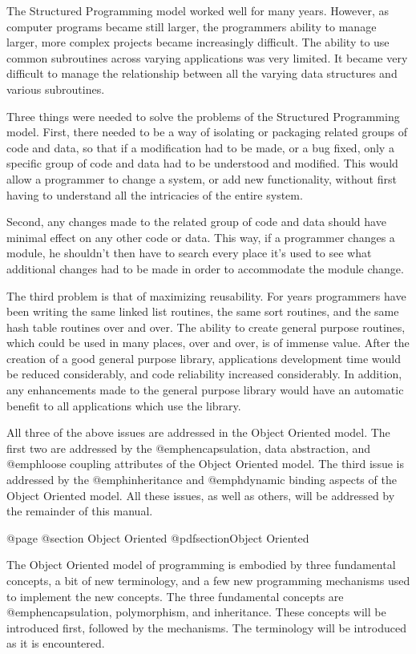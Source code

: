 The Structured Programming model worked well for many years.  However,
as computer programs became still larger, the programmers ability to
manage larger, more complex projects became increasingly difficult.  The
ability to use common subroutines across varying applications was very
limited.  It became very difficult to manage the relationship between
all the varying data structures and various subroutines.

Three things were needed to solve the problems of the Structured Programming
model.  First, there needed to be a way of isolating or packaging related
groups of code and data, so that if a modification had to be made, or a bug 
fixed, only a specific group of code and data had to be understood and
modified.  This would allow a programmer to change a system, or add new
functionality, without first having to understand all the intricacies of the
entire system.

Second, any changes made to the related group of code and data should
have minimal effect on any other code or data.  This way, if a
programmer changes a module, he shouldn't then have to search every
place it's used to see what additional changes had to be made in order
to accommodate the module change.

The third problem is that of maximizing reusability.  For years
programmers have been writing the same linked list routines, the same
sort routines, and the same hash table routines over and over.  The
ability to create general purpose routines, which could be used in many
places, over and over, is of immense value.  After the creation of
a good general purpose library, applications development time would be
reduced considerably, and code reliability increased considerably.
In addition, any enhancements made to the general purpose library
would have an automatic benefit to all applications which use the library.

All three of the above issues are addressed in the Object Oriented
model.  The first two are addressed by the @emph{encapsulation, data
abstraction}, and @emph{loose coupling} attributes of the Object Oriented
model.  The third issue is addressed by the @emph{inheritance} and
@emph{dynamic binding} aspects of the Object Oriented model.  All these
issues, as well as others, will be addressed by the remainder of this
manual.

@page
@section Object Oriented
@pdfsection{Object Oriented}

The Object Oriented model of programming is embodied by three
fundamental concepts, a bit of new terminology, and a few new
programming mechanisms used to implement the new concepts.  The three
fundamental concepts are @emph{encapsulation, polymorphism, and inheritance}.
These concepts will be introduced first, followed by the mechanisms.
The terminology will be introduced as it is encountered.

